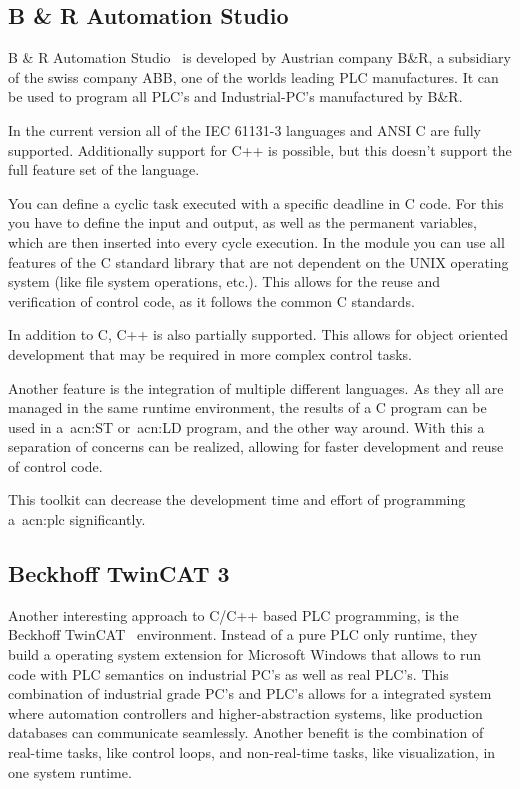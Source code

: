\subsection{B \& R Automation Studio}
B \& R Automation Studio~\cite{b-r_automation:2020} is developed by Austrian company B\&R, a subsidiary of the swiss company ABB, one of the worlds leading PLC manufactures.
It can be used to program all PLC's and Industrial-PC's manufactured by B\&R.

In the current version all of the IEC 61131-3 languages and ANSI C are fully supported.
Additionally support for C++ is possible, but this doesn't support the full feature set of the language.

You can define a cyclic task executed with a specific deadline in C code.
For this you have to define the input and output, as well as the permanent variables, which are then inserted into every cycle execution.
In the module you can use all features of the C standard library that are not dependent on the UNIX operating system (like file system operations, etc.).
This allows for the reuse and verification of control code, as it follows the common C standards.

In addition to C, C++ is also partially supported.
This allows for object oriented development that may be required in more complex control tasks.

Another feature is the integration of multiple different languages.
As they all are managed in the same runtime environment, the results of a C program can be used in a~\acrfull{acn:ST} or~\acrfull{acn:LD} program, and the other way around.
With this a separation of concerns can be realized, allowing for faster development and reuse of control code.

This toolkit can decrease the development time and effort of programming a~\acrshort{acn:plc} significantly.


\subsection{Beckhoff TwinCAT 3}

Another interesting approach to C/C++ based PLC programming, is the Beckhoff TwinCAT~\cite{Beckhoff:2020:2} environment.
Instead of a pure PLC only runtime, they build a operating system extension for Microsoft Windows that allows to run code with PLC semantics on industrial PC's as well as real PLC's.
This combination of industrial grade PC's and PLC's allows for a integrated system where automation controllers and higher-abstraction systems, like production databases can communicate seamlessly.
Another benefit is the combination of real-time tasks, like control loops, and non-real-time tasks, like visualization, in one system runtime.

